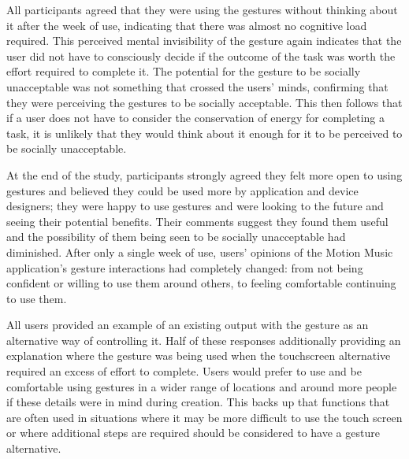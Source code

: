 \documentclass{l4proj}
\begin{document}
All participants agreed that they were using the gestures without thinking about it after the week of use, indicating that there was almost no cognitive load required. This perceived mental invisibility of the gesture again indicates that the user did not have to consciously decide if the outcome of the task was worth the effort required to complete it. The potential for the gesture to be socially unacceptable was not something that crossed the users' minds, confirming that they were perceiving the gestures to be socially acceptable. This then follows that if a user does not have to consider the conservation of energy for completing a task, it is unlikely that they would think about it enough for it to be perceived to be socially unacceptable.

At the end of the study, participants strongly agreed they felt more open to using gestures and believed they could be used more by application and device designers; they were happy to use gestures and were looking to the future and seeing their potential benefits. Their comments suggest they found them useful and the possibility of them being seen to be socially unacceptable had diminished. After only a single week of use, users’ opinions of the Motion Music application's gesture interactions had completely changed: from not being confident or willing to use them around others, to feeling comfortable continuing to use them.

All users provided an example of an existing output with the gesture as an alternative way of controlling it. Half of these responses additionally providing an explanation where the gesture was being used when the touchscreen alternative required an excess of effort to complete. Users would prefer to use and be comfortable using gestures in a wider range of locations and around more people if these details were in mind during creation. This backs up that functions that are often used in situations where it may be more difficult to use the touch screen or where additional steps are required should be considered to have a gesture alternative. 
\end{document}
